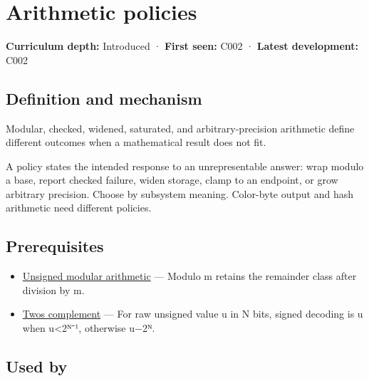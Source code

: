 \hypertarget{appendix-2ed044358b82}{}\label{referencestart:appendix-2ed044358b82}
\section{Arithmetic policies}\label{appendix-2ed044358b82-arithmetic-policies}

\textbf{Curriculum depth:} Introduced · \textbf{First seen:} C002 · \textbf{Latest development:} C002

\subsection{Definition and mechanism}\label{appendix-2ed044358b82-definition-and-mechanism}

Modular, checked, widened, saturated, and arbitrary-precision arithmetic define different outcomes when a mathematical result does not fit.

A policy states the intended response to an unrepresentable answer: wrap modulo a base, report checked failure, widen storage, clamp to an endpoint, or grow arbitrary precision. Choose by subsystem meaning. Color-byte output and hash arithmetic need different policies.

\subsection{Prerequisites}\label{appendix-2ed044358b82-prerequisites}

\begin{itemize}
\tightlist
\item
  \hyperref[appendix-c99977d88b33]{Unsigned modular arithmetic} --- Modulo m retains the remainder class after division by m.
\item
  \hyperref[appendix-4fbc03d20829]{Two\textquotesingle s complement} --- For raw unsigned value u in N bits, signed decoding is u when u\textless2ᴺ⁻¹, otherwise u−2ᴺ.
\end{itemize}

\subsection{Used by}\label{appendix-2ed044358b82-used-by}

